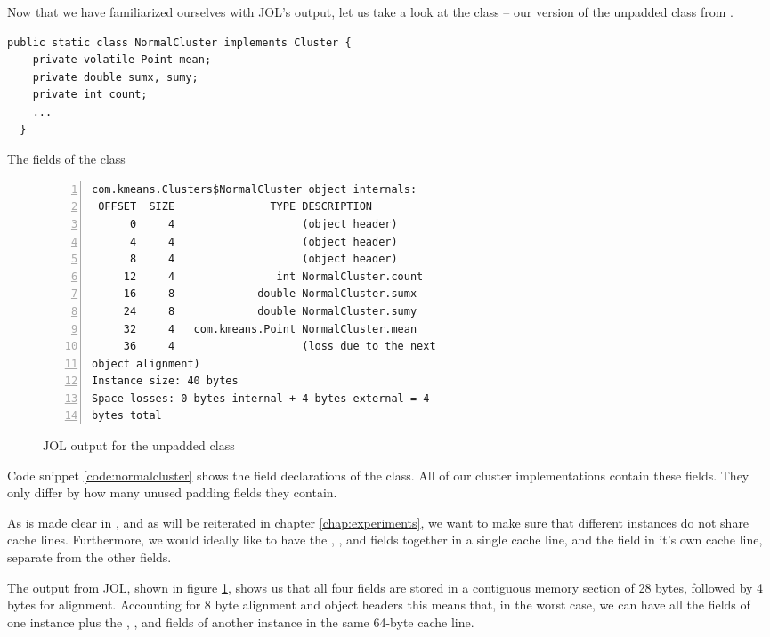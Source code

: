 Now that we have familiarized ourselves with JOL's output, let us take a look at
the  class -- our version of the unpadded 
class from \cite{mystery}.

\begin{code}
\begin{Verbatim}[frame=single]
  public static class NormalCluster implements Cluster {
    private volatile Point mean;
    private double sumx, sumy;
    private int count;
    ...
  }
\end{Verbatim}
	\caption{The fields of the  class}
	\label{code:normalcluster}
\end{code}

\begin{figure}[h]
\begin{Verbatim}[frame=single, numbers=left]
com.kmeans.Clusters$NormalCluster object internals:
 OFFSET  SIZE               TYPE DESCRIPTION
      0     4                    (object header)
      4     4                    (object header)
      8     4                    (object header)
     12     4                int NormalCluster.count
     16     8             double NormalCluster.sumx
     24     8             double NormalCluster.sumy
     32     4   com.kmeans.Point NormalCluster.mean
     36     4                    (loss due to the next
object alignment)
Instance size: 40 bytes
Space losses: 0 bytes internal + 4 bytes external = 4
bytes total
\end{Verbatim}
	\caption{JOL output for the unpadded  class}
	\label{jol:normalcluster}
\end{figure}

Code snippet \ref{code:normalcluster} shows the field declarations of the
 class. All of our cluster implementations contain these
fields. They only differ by how many unused padding fields they contain.

As is made clear in \cite{mystery}, and as will be reiterated in chapter
\ref{chap:experiments}, we want to make sure that different 
instances do not share cache lines. Furthermore, we would
ideally like to have the , , and  fields
together in a single cache line, and the  field in it's own
cache line, separate from the other fields.

The output from JOL, shown in figure \ref{jol:normalcluster}, shows us that all four fields are stored in a contiguous
memory section of 28 bytes, followed by 4 bytes for alignment. Accounting for 8 byte alignment and object headers
this means that, in the worst case, we can have all the fields of one
 instance plus the , , and 
fields of another instance in the same 64-byte cache line.

